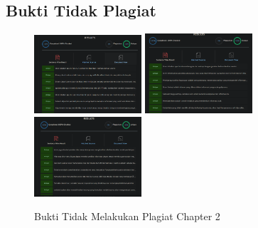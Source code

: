 \subsection{Bukti Tidak Plagiat}
\begin{figure}[H]
\centering
	\includegraphics[width=4cm]{figures/1174015/tugas2/buktiplagiat/1.PNG}
	\includegraphics[width=4cm]{figures/1174015/tugas2/buktiplagiat/2.PNG}
	\includegraphics[width=4cm]{figures/1174015/tugas2/buktiplagiat/3.PNG}
	\caption{Bukti Tidak Melakukan Plagiat Chapter 2}
\end{figure}

